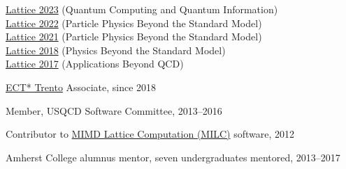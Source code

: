 \documentclass[10 pt]{article}
\newenvironment{tightlist}
  {\begin{list} {} {\setlength{\topsep}{-8 pt} \setlength{\itemsep}{-3 pt} \setlength{\leftmargin}{0 mm}}}{\end{list}}
\newcommand{\blankline}{\quad\pagebreak[2]}
\newcommand{\spacer}{\blankline\vspace{12 pt}\blankline}
\begin{document}
\begin{tightlist}
    \qquad \href{https://indico.fnal.gov/event/57249/}{Lattice 2023} (Quantum Computing and Quantum Information)        \\
    \qquad \href{https://indico.hiskp.uni-bonn.de/event/40/}{Lattice 2022} (Particle Physics Beyond the Standard Model) \\
    \qquad \href{https://indico.cern.ch/event/1006302/}{Lattice 2021} (Particle Physics Beyond the Standard Model)      \\
    \qquad \href{https://indico.fnal.gov/event/15949/}{Lattice 2018} (Physics Beyond the Standard Model)                \\
    \qquad \href{http://wpd.ugr.es/~lattice2017/}{Lattice 2017} (Applications Beyond QCD)
  \item \href{http://www.ectstar.eu}{ECT* Trento} Associate, since 2018 %
  \item Member, USQCD Software Committee, 2013--2016
  \item Contributor to \href{https://github.com/milc-qcd/milc_qcd/}{MIMD Lattice Computation (MILC)} software, 2012
  \item Amherst College alumnus mentor, seven undergraduates mentored, 2013--2017 %
\end{tightlist}

\spacer
\end{document}
